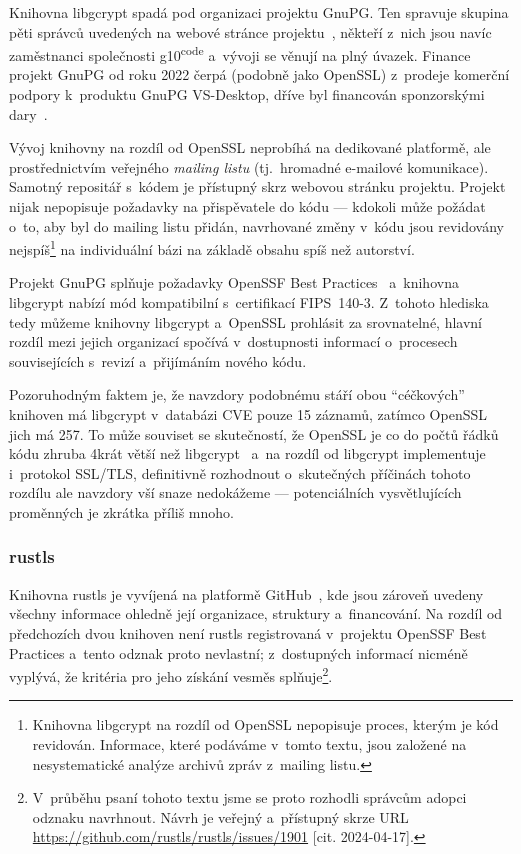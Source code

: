 Knihovna libgcrypt spadá pod organizaci projektu GnuPG. Ten spravuje skupina pěti správců uvedených na webové stránce projektu~\cite{gnupg-people}, někteří z~nich jsou navíc zaměstnanci společnosti g10\textsuperscript{code} a~vývoji se věnují na plný úvazek. Finance projekt GnuPG od roku 2022 čerpá (podobně jako OpenSSL) z~prodeje komerční podpory k~produktu GnuPG VS-Desktop, dříve byl financován sponzorskými dary~\cite{gnupg-new-future}.

Vývoj knihovny na rozdíl od OpenSSL neprobíhá na dedikované platformě, ale pro\-střed\-nic\-t\-vím veřejného \textit{mailing listu} (tj.~hromadné e-mailové komunikace). Samotný repositář s~kódem je přístupný skrz webovou stránku projektu. Projekt nijak nepopisuje požadavky na přispěvatele do kódu --- kdokoli může požádat o~to, aby byl do mailing listu přidán, navrhované změny v~kódu jsou revidovány nejspíš\footnote{Knihovna libgcrypt na rozdíl od OpenSSL nepopisuje proces, kterým je kód revidován. Informace, které podáváme v~tomto textu, jsou založené na nesystematické analýze archivů zpráv z~mailing listu.} na individuální bázi na základě obsahu spíš než autorství.

Projekt GnuPG splňuje požadavky OpenSSF Best Practices~\cite{gnupg-openssf} a~knihovna libgcrypt nabízí mód kompatibilní s~certifikací FIPS~140-3. Z~tohoto hlediska tedy můžeme knihovny libgcrypt a~OpenSSL prohlásit za srovnatelné, hlavní rozdíl mezi jejich organizací spočívá v~dostupnosti informací o~procesech souvisejících s~revizí a~přijímáním nového kódu.

Pozoruhodným faktem je, že navzdory podobnému stáří obou ``céčkových'' knihoven má lib\-g\-crypt v~databázi CVE pouze 15 záznamů, zatímco OpenSSL jich má 257. To může souviset se skutečností, že OpenSSL je co do počtů řádků kódu zhruba 4krát větší než libgcrypt~\cite{cloc-openssl-libgcrypt} a~na rozdíl od libgcrypt implementuje i~protokol SSL/TLS, definitivně rozhodnout o~skutečných příčinách tohoto rozdílu ale navzdory vší snaze nedokážeme --- potenciálních vysvětlujících proměnných je zkrátka příliš mnoho.

\subsubsection*{rustls}

Knihovna rustls je vyvíjená na platformě GitHub~\cite{rustls-gh}, kde jsou zároveň uvedeny všechny informace ohledně její organizace, struktury a~financování. Na rozdíl od předchozích dvou knihoven není rustls registrovaná v~projektu OpenSSF Best Practices a~tento odznak proto nevlastní; z~dostupných informací nicméně vyplývá, že kritéria pro jeho získání vesměs splňuje\footnote{V~průběhu psaní tohoto textu jsme se proto rozhodli správcům adopci odznaku navrhnout. Návrh je veřejný a~přístupný skrze URL \url{https://github.com/rustls/rustls/issues/1901} [cit. 2024-04-17].}.

